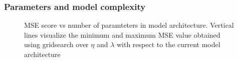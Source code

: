 \documentclass
[twocolumn,
secnumarabic,
nobibnotes,
aps,
prl,
reprint,
groupedaddress,
amsmath,
amssymb
]{revtex4-2}
\begin{document}
\subsubsection{Parameters and model complexity}
\begin{figure}
  \caption{MSE score vs number of paramteters in model architecture. Vertical lines visualize the minimum and maximum MSE value obtained using gridsearch over $\eta$ and $\lambda$ with respect to the current model architecture\label{fig:NN_model_complexity}}
\end{figure}
\end{document}

